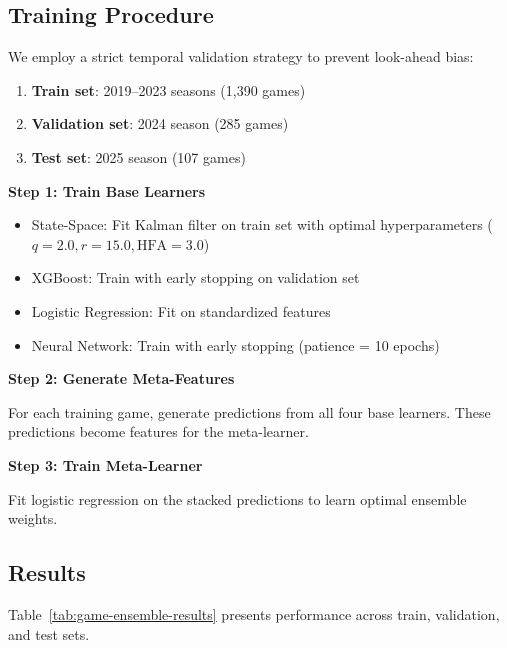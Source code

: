 \subsection{Training Procedure}

We employ a strict temporal validation strategy to prevent look-ahead bias:

\begin{enumerate}
    \item \textbf{Train set}: 2019--2023 seasons (1,390 games)
    \item \textbf{Validation set}: 2024 season (285 games)
    \item \textbf{Test set}: 2025 season (107 games)
\end{enumerate}

\textbf{Step 1: Train Base Learners}
\begin{itemize}
    \item State-Space: Fit Kalman filter on train set with optimal hyperparameters ($q=2.0, r=15.0, \text{HFA}=3.0$)
    \item XGBoost: Train with early stopping on validation set
    \item Logistic Regression: Fit on standardized features
    \item Neural Network: Train with early stopping (patience = 10 epochs)
\end{itemize}

\textbf{Step 2: Generate Meta-Features}

For each training game, generate predictions from all four base learners. These predictions become features for the meta-learner.

\textbf{Step 3: Train Meta-Learner}

Fit logistic regression on the stacked predictions to learn optimal ensemble weights.

\subsection{Results}

Table~\ref{tab:game-ensemble-results} presents performance across train, validation, and test sets.

